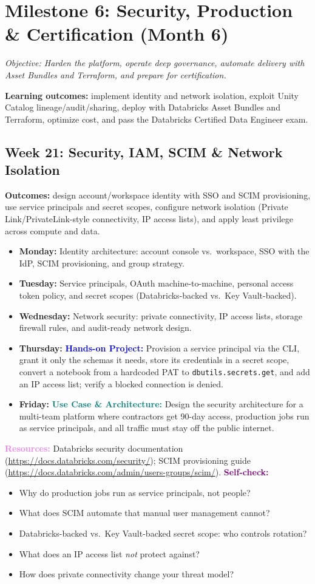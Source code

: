 \documentclass[11pt, a4paper]{article}
\newcommand{\project}[1]{\vspace{1mm}\noindent\textbf{\textcolor{blue}{Hands-on Project:}} #1}
\newcommand{\usecase}[1]{\vspace{1mm}\noindent\textbf{\textcolor{teal}{Use Case \& Architecture:}} #1}
\newcommand{\dayitem}[2]{\item \textbf{#1:} #2}
\newcommand{\resources}[1]{\vspace{1mm}\noindent\textbf{\textcolor{violet}{Resources:}} #1}
\newcommand{\selfcheck}[1]{\vspace{1mm}\noindent\textbf{\textcolor{purple}{Self-check:}} #1}
\begin{document}
\section{Milestone 6: Security, Production \& Certification (Month 6)}
\textit{Objective: Harden the platform, operate deep governance, automate delivery with Asset Bundles and Terraform, and prepare for certification.}
\par\noindent\textbf{Learning outcomes:} implement identity and network isolation, exploit Unity Catalog lineage/audit/sharing, deploy with Databricks Asset Bundles and Terraform, optimize cost, and pass the Databricks Certified Data Engineer exam.

\subsection*{Week 21: Security, IAM, SCIM \& Network Isolation}
\par\noindent\textbf{Outcomes:} design account/workspace identity with SSO and SCIM provisioning, use service principals and secret scopes, configure network isolation (Private Link/PrivateLink-style connectivity, IP access lists), and apply least privilege across compute and data.
\begin{itemize}[label=-]
    \dayitem{Monday}{Identity architecture: account console vs.\ workspace, SSO with the IdP, SCIM provisioning, and group strategy.}
    \dayitem{Tuesday}{Service principals, OAuth machine-to-machine, personal access token policy, and secret scopes (Databricks-backed vs.\ Key Vault-backed).}
    \dayitem{Wednesday}{Network security: private connectivity, IP access lists, storage firewall rules, and audit-ready network design.}
    \dayitem{Thursday}{\project{Provision a service principal via the CLI, grant it only the schemas it needs, store its credentials in a secret scope, convert a notebook from a hardcoded PAT to \texttt{dbutils.secrets.get}, and add an IP access list; verify a blocked connection is denied.}}
    \dayitem{Friday}{\usecase{Design the security architecture for a multi-team platform where contractors get 90-day access, production jobs run as service principals, and all traffic must stay off the public internet.}}
\end{itemize}
\resources{Databricks security documentation (\url{https://docs.databricks.com/security/}); SCIM provisioning guide (\url{https://docs.databricks.com/admin/users-groups/scim/}).}
\selfcheck{\begin{itemize}[label=-, leftmargin=1.5em, itemsep=0pt]
    \item Why do production jobs run as service principals, not people?
    \item What does SCIM automate that manual user management cannot?
    \item Databricks-backed vs.\ Key Vault-backed secret scope: who controls rotation?
    \item What does an IP access list \emph{not} protect against?
    \item How does private connectivity change your threat model?
\end{itemize}}
\end{document}
